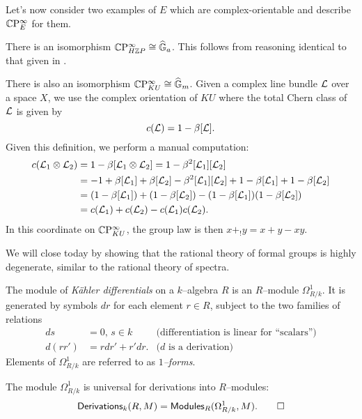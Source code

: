 Let's now consider two examples of $E$ which are complex-orientable and describe $\mathbb{C}\mathrm P^\infty_E$ for them.

\begin{example}
There is an isomorphism $\mathbb{C}\mathrm P^\infty_{H\mathbb Z P} \cong \widehat{\mathbb G}_a$.  This follows from reasoning identical to that given in .
\end{example}

\begin{example}
There is also an isomorphism $\mathbb{C}\mathrm P^\infty_{KU} \cong \widehat{\mathbb G}_m$.  Given a complex line bundle $\mathcal{L}$ over a space $X$, we use the complex orientation of $KU$ where the total Chern class of $\mathcal{L}$ is given by \[c(\mathcal{L}) = 1 - \beta[\mathcal{L}].\]  Given this definition, we perform a manual computation:
\begin{align*}
c(\mathcal{L}_1 \otimes \mathcal{L}_2) & = 1 - \beta [\mathcal{L}_1 \otimes \mathcal{L}_2] = 1 - \beta^2 [\mathcal{L}_1] [\mathcal{L}_2] \\
& = -1 + \beta[\mathcal{L}_1] + \beta[\mathcal{L}_2] - \beta^2 [\mathcal{L}_1] [\mathcal{L}_2] + 1 - \beta[\mathcal{L}_1] + 1 - \beta[\mathcal{L}_2] \\
& = (1 - \beta[\mathcal{L}_1]) + (1 - \beta[\mathcal{L}_2]) - (1 - \beta[\mathcal{L}_1])(1 - \beta[\mathcal{L}_2]) \\
& = c(\mathcal{L}_1) + c(\mathcal{L}_2) - c(\mathcal{L}_1) c(\mathcal{L}_2).
\end{align*}
In this coordinate on $\mathbb{C}\mathrm P^\infty_{KU}$, the group law is then $x +_! y = x + y - xy$.
\end{example}

We will close today by showing that the rational theory of formal groups is highly degenerate, similar to the rational theory of spectra.

\begin{definition}
The module of \textit{K\"ahler differentials} on a $k$--algebra $R$ is an $R$--module $\Omega^1_{R/k}$.  It is generated by symbols $dr$ for each element $r \in R$, subject to the two families of relations
\begin{align*}
ds & = 0, \, s \in k & \text{(differentiation is linear for ``scalars'')} \\
d(rr') & = rdr' + r'dr. & \text{($d$ is a derivation)}
\end{align*}
Elements of $\Omega^1_{R/k}$ are referred to as \textit{$1$--forms}.
\end{definition}

\begin{lemma}
The module $\Omega^1_{R/k}$ is universal for derivations into $R$--modules: \[\mathsf{Derivations}_k(R, M) = \mathsf{Modules}_R(\Omega^1_{R/k}, M). \qed\]
\end{lemma}

